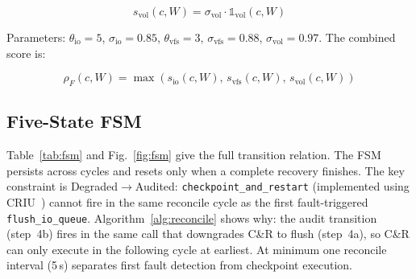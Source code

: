 \documentclass[conference]{IEEEtran}
\begin{document}
\begin{equation}
s_{\mathrm{vol}}(c, W) = \sigma_{\mathrm{vol}} \cdot \mathbb{1}_{\mathrm{vol}}(c, W)
\label{eq:svol}
\end{equation}

Parameters: $\theta_{\mathrm{io}} = 5$, $\sigma_{\mathrm{io}} = 0.85$, $\theta_{\mathrm{vfs}} = 3$, $\sigma_{\mathrm{vfs}} = 0.88$, $\sigma_{\mathrm{vol}} = 0.97$. The combined score is:

\begin{equation}
\rho_F(c, W) = \max(s_{\mathrm{io}}(c, W),\, s_{\mathrm{vfs}}(c, W),\, s_{\mathrm{vol}}(c, W))
\label{eq:rhoF}
\end{equation}

\subsection{Five-State FSM}

Table~\ref{tab:fsm} and Fig.~\ref{fig:fsm} give the full transition relation. The FSM persists across cycles and resets only when a complete recovery finishes. The key constraint is Degraded$\rightarrow$Audited: \texttt{checkpoint\_and\_restart} (implemented using CRIU~\cite{b2}) cannot fire in the same reconcile cycle as the first fault-triggered \texttt{flush\_io\_queue}. Algorithm~\ref{alg:reconcile} shows why: the audit transition (step~4b) fires in the same call that downgrades C\&R to flush (step~4a), so C\&R can only execute in the following cycle at earliest. At minimum one reconcile interval (5\,s) separates first fault detection from checkpoint execution.

\begin{table}[!t]
\caption{TYPE F FSM TRANSITION RELATION.}
\label{tab:fsm}
\centering
\renewcommand{\arraystretch}{1.15}
\end{table}
\end{document}
